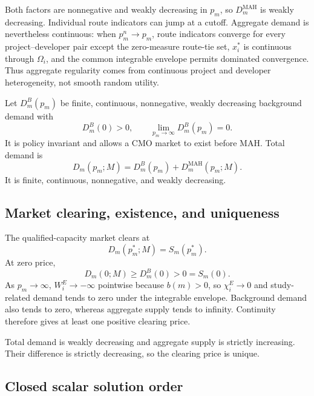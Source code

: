 Both factors are nonnegative and weakly decreasing in \(p_m\), so
\(D_m^{\mathrm{MAH}}\) is weakly decreasing. Individual route indicators can
jump at a cutoff. Aggregate demand is nevertheless continuous: when
\(p_m^n\to p_m\), route indicators converge for every project--developer
pair except the zero-measure route-tie set, \(x_i^*\) is continuous through
\(\Omega_i\), and the common integrable envelope permits dominated
convergence. Thus aggregate regularity comes from continuous project and
developer heterogeneity, not smooth random utility.

Let \(D_m^B(p_m)\) be finite, continuous, nonnegative, weakly decreasing
background demand with
\[
  D_m^B(0)>0,
  \qquad
  \lim_{p_m\to\infty}D_m^B(p_m)=0.
\]
It is policy invariant and allows a CMO market to exist before MAH. Total
demand is
\begin{equation}
  D_m(p_m;M)
  =
  D_m^B(p_m)
  +
  D_m^{\mathrm{MAH}}(p_m;M).
  \label{eq:p06-total-demand}
\end{equation}
It is finite, continuous, nonnegative, and weakly decreasing.

\subsection{Market clearing, existence, and uniqueness}
\label{subsec:p06-clearing}

The qualified-capacity market clears at
\begin{equation}
  D_m(p_m^*;M)=S_m(p_m^*).
  \label{eq:p06-market-clearing}
\end{equation}
At zero price,
\begin{equation}
  D_m(0;M)\geq D_m^B(0)>0=S_m(0).
  \label{eq:p06-existence-boundaries}
\end{equation}
As \(p_m\to\infty\), \(W_i^E\to-\infty\) pointwise because
\(b(m)>0\), so \(\chi_i^E\to0\) and study-related demand tends to zero
under the integrable envelope. Background demand also tends to zero, whereas
aggregate supply tends to infinity. Continuity therefore gives at least one
positive clearing price.

Total demand is weakly decreasing and aggregate supply is strictly
increasing. Their difference is strictly decreasing, so the clearing price
is unique.

\subsection{Closed scalar solution order}
\label{subsec:p06-solution-order}

